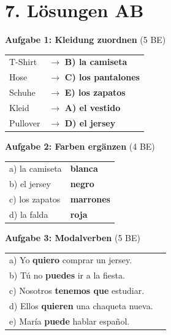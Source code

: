 \documentclass[11pt, a4paper]{article}
\newcommand{\loesung}[1]{\textcolor{loesung}{\textbf{#1}}}
\begin{document}

\section*{7. Lösungen AB}

\textbf{Aufgabe 1: Kleidung zuordnen} (5 BE)

\begin{tabular}{ll}
T-Shirt & $\rightarrow$ \loesung{B) la camiseta} \\
Hose & $\rightarrow$ \loesung{C) los pantalones} \\
Schuhe & $\rightarrow$ \loesung{E) los zapatos} \\
Kleid & $\rightarrow$ \loesung{A) el vestido} \\
Pullover & $\rightarrow$ \loesung{D) el jersey} \\
\end{tabular}

\vspace{0.8em}

\textbf{Aufgabe 2: Farben ergänzen} (4 BE)

\begin{tabular}{ll}
a) la camiseta & \loesung{blanca} \\
b) el jersey & \loesung{negro} \\
c) los zapatos & \loesung{marrones} \\
d) la falda & \loesung{roja} \\
\end{tabular}

\vspace{0.8em}

\textbf{Aufgabe 3: Modalverben} (5 BE)

\begin{tabular}{ll}
a) Yo \loesung{quiero} comprar un jersey. \\
b) Tú no \loesung{puedes} ir a la fiesta. \\
c) Nosotros \loesung{tenemos que} estudiar. \\
d) Ellos \loesung{quieren} una chaqueta nueva. \\
e) María \loesung{puede} hablar español. \\
\end{tabular}

\vspace{0.8em}
\end{document}
